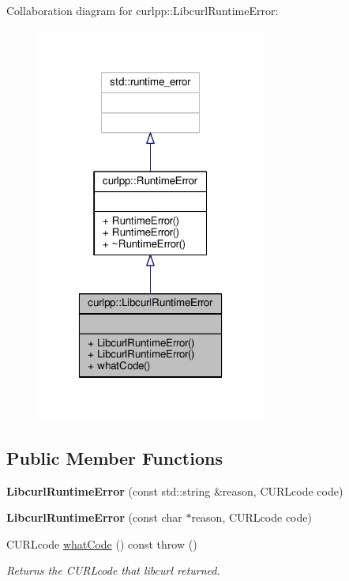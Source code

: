Collaboration diagram for curlpp\-:\-:Libcurl\-Runtime\-Error\-:
\nopagebreak
\begin{figure}[H]
\begin{center}
\leavevmode
\includegraphics[width=214pt]{classcurlpp_1_1LibcurlRuntimeError__coll__graph}
\end{center}
\end{figure}
\subsection*{Public Member Functions}
\begin{DoxyCompactItemize}
\item 
\hypertarget{classcurlpp_1_1LibcurlRuntimeError_ac12552bff88ba246f7f2955d38111195}{{\bfseries Libcurl\-Runtime\-Error} (const std\-::string \&reason, C\-U\-R\-Lcode code)}\label{classcurlpp_1_1LibcurlRuntimeError_ac12552bff88ba246f7f2955d38111195}

\item 
\hypertarget{classcurlpp_1_1LibcurlRuntimeError_ab69096e7d31046d04225694c6e2a8a43}{{\bfseries Libcurl\-Runtime\-Error} (const char $\ast$reason, C\-U\-R\-Lcode code)}\label{classcurlpp_1_1LibcurlRuntimeError_ab69096e7d31046d04225694c6e2a8a43}

\item 
\hypertarget{classcurlpp_1_1LibcurlRuntimeError_aa101aee12fe88d1a36ce37fdbd297da0}{C\-U\-R\-Lcode \hyperlink{classcurlpp_1_1LibcurlRuntimeError_aa101aee12fe88d1a36ce37fdbd297da0}{what\-Code} () const   throw ()}\label{classcurlpp_1_1LibcurlRuntimeError_aa101aee12fe88d1a36ce37fdbd297da0}

\begin{DoxyCompactList}\small\item\em Returns the C\-U\-R\-Lcode that libcurl returned. \end{DoxyCompactList}\end{DoxyCompactItemize}



